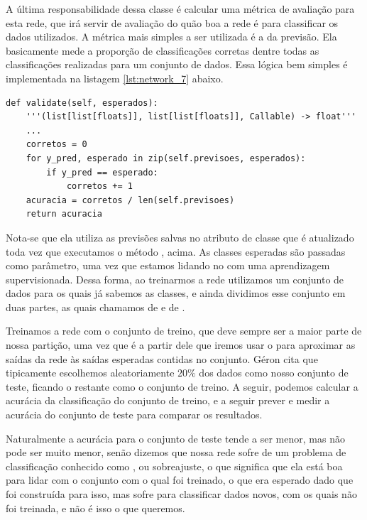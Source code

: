 A última responsabilidade dessa classe é calcular uma métrica de avaliação para esta rede, que irá servir de avaliação do quão boa a rede é para classificar os dados utilizados. A métrica mais simples a ser utilizada é a  da previsão. Ela basicamente mede a proporção de classificações corretas dentre todas as classificações realizadas para um conjunto de dados. Essa lógica bem simples é implementada na listagem \ref{lst:network_7} abaixo. 
\newline
\estiloR
\begin{lstlisting}[caption={Trecho da classe \eng{Network}}, label={lst:network_7}, escapeinside={\%}]
def validate(self, esperados):
    '''(list[list[floats]], list[list[floats]], Callable) -> float'''
    ...
    corretos = 0
    for y_pred, esperado in zip(self.previsoes, esperados):
        if y_pred == esperado:
            corretos += 1
    acuracia = corretos / len(self.previsoes)
    return acuracia
\end{lstlisting}


Nota-se que ela utiliza as previsões salvas no atributo de classe que é atualizado toda vez que executamos o método , acima. As classes esperadas são passadas como parâmetro, uma vez que estamos lidando no  com uma aprendizagem supervisionada. Dessa forma, ao treinarmos a rede utilizamos um conjunto de dados para os quais já sabemos as classes, e ainda dividimos esse conjunto em duas partes, as quais chamamos de  e de .

Treinamos a rede com o conjunto de treino, que deve sempre ser a maior parte de nossa partição, uma vez que é a partir dele que iremos usar o  para aproximar as saídas da rede às saídas esperadas contidas no conjunto. Géron \citep{hands} cita que tipicamente escolhemos aleatoriamente $20\%$ dos dados como nosso conjunto de teste, ficando o restante como o conjunto de treino. A seguir, podemos calcular a acurácia da classificação do conjunto de treino, e a seguir prever e medir a acurácia do conjunto de teste para comparar os resultados. 

Naturalmente a acurácia para o conjunto de teste tende a ser menor, mas não pode ser muito menor, senão dizemos que nossa rede sofre de um problema de classificação conhecido como , ou sobreajuste, o que significa que ela está boa para lidar com o conjunto com o qual foi treinado, o que era esperado dado que foi construída para isso, mas sofre para classificar dados novos, com os quais não foi treinada, e não é isso o que queremos. 

